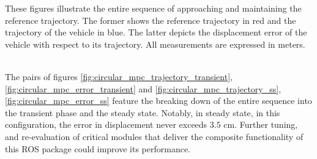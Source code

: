 These figures illustrate the entire sequence of approaching and maintaining
the reference trajectory. The former shows the reference trajectory in red
and the trajectory of the vehicle in blue. The latter depicts the displacement
error of the vehicle with respect to its trajectory. All measurements are
expressed in meters.

\noindent{}\\

The pairs of figures \ref{fig:circular_mpc_trajectory_transient}, \ref{fig:circular_mpc_error_transient}
and \ref{fig:circular_mpc_trajectory_ss}, \ref{fig:circular_mpc_error_ss}
feature the breaking down of the entire sequence into the transient phase
and the steady state. Notably, in steady state, in this configuration, the
error in displacement never exceeds $3.5$ cm. Further tuning, and re-evaluation
of critical modules that deliver the composite functionality of this ROS
package could improve its performance.


